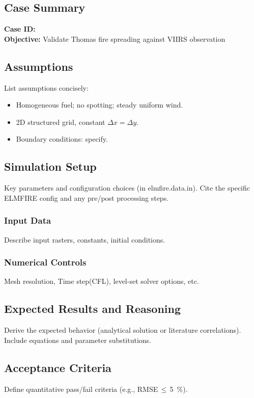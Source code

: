 \documentclass[../report/case_report.tex]{subfiles}
\begin{document}
\subsection*{Case Summary}
\textbf{Case ID:} \CaseID\\
\textbf{Objective:} Validate Thomas fire spreading against VIIRS observation


\subsection{Assumptions}
List assumptions concisely:
\begin{itemize}[nosep]
\item Homogeneous fuel; no spotting; steady uniform wind.
\item 2D structured grid, constant \(\Delta x = \Delta y\).
\item Boundary conditions: specify.
\end{itemize}


\subsection{Simulation Setup}
Key parameters and configuration choices (in elmfire.data.in). Cite the specific ELMFIRE config and any pre/post processing steps.


\subsubsection{Input Data}
Describe input rasters, constants, initial conditions.


\subsubsection{Numerical Controls}
Mesh resolution, Time step(CFL), level-set solver options, etc.


\subsection{Expected Results and Reasoning}
Derive the expected behavior (analytical solution or literature correlations). Include equations and parameter substitutions.


\subsection{Acceptance Criteria}
Define quantitative pass/fail criteria (e.g., RMSE\,\(\leq\)\,\SI{5}{\percent}).
\end{document}
